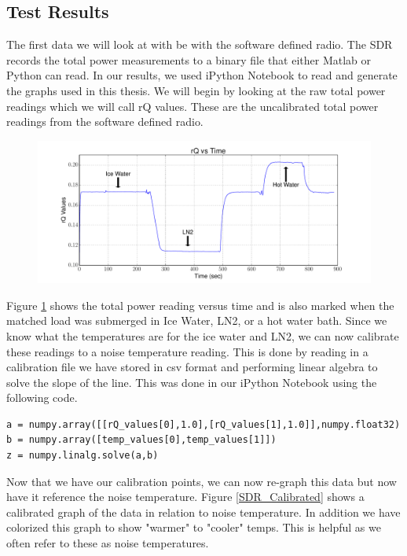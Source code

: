 \subsection{Test Results}

The first data we will look at with be with the software defined radio.  The SDR records the total power measurements to a binary file that either Matlab or Python can read.  In our results, we used iPython Notebook to read and generate the graphs used in this thesis.  We will begin by looking at the raw total power readings which we will call rQ values.  These are the uncalibrated total power readings from the software defined radio.  

\begin{figure}[h!tb] \centering

\includegraphics[width=\textwidth]{Experiments/Exp1/rqvstime_annotate.pdf}

\label{SDR_rQ}
\end{figure}

Figure \ref{SDR_rQ} shows the total power reading versus time and is also marked when the matched load was submerged in Ice Water, LN2, or a hot water bath.  Since we know what the temperatures are for the ice water and LN2, we can now calibrate these readings to a noise temperature reading.  This is done by reading in a calibration file we have stored in csv format and performing linear algebra to solve the slope of the line.  This was done in our iPython Notebook using the following code.
\lstset{language=Python}
\begin{lstlisting}[frame=single,keywordstyle=\color{blue}]
a = numpy.array([[rQ_values[0],1.0],[rQ_values[1],1.0]],numpy.float32)
b = numpy.array([temp_values[0],temp_values[1]])
z = numpy.linalg.solve(a,b)
\end{lstlisting}

Now that we have our calibration points, we can now re-graph this data but now have it reference the noise temperature. Figure \ref{SDR_Calibrated} shows a calibrated graph of the data in relation to noise temperature.  In addition we have colorized this graph to show "warmer" to "cooler" temps.  This is helpful as we often refer to these as noise temperatures.

